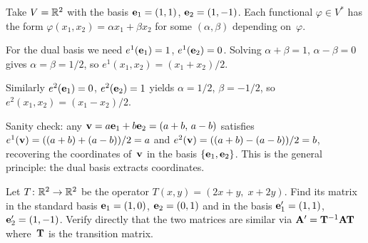 \begin{example}
\label{ex:dual-basis-numeric}
Take $V = \mathbb{R}^2$ with the basis
$\mathbf{e}_1 = (1, 1)$, $\mathbf{e}_2 = (1, -1)$. Each functional
$\varphi \in V^{*}$ has the form $\varphi(x_1, x_2) = \alpha x_1 + \beta x_2$
for some $(\alpha, \beta)$ depending on~$\varphi$.

For the dual basis we need $e^1(\mathbf{e}_1) = 1$, $e^1(\mathbf{e}_2) = 0$.
Solving $\alpha + \beta = 1$, $\alpha - \beta = 0$ gives
$\alpha = \beta = 1/2$, so $e^1(x_1, x_2) = (x_1 + x_2)/2$.

Similarly $e^2(\mathbf{e}_1) = 0$, $e^2(\mathbf{e}_2) = 1$ yields
$\alpha = 1/2$, $\beta = -1/2$, so $e^2(x_1, x_2) = (x_1 - x_2)/2$.

Sanity check: any $\mathbf{v} = a \mathbf{e}_1 + b \mathbf{e}_2 = (a + b,\, a - b)$
satisfies $e^1(\mathbf{v}) = ((a + b) + (a - b))/2 = a$ and
$e^2(\mathbf{v}) = ((a + b) - (a - b))/2 = b$, recovering the
coordinates of~$\mathbf{v}$ in the basis $\{\mathbf{e}_1, \mathbf{e}_2\}$.
This is the general principle: the dual basis extracts coordinates.
\end{example}

\begin{problem}
\label{prob:operator-similarity}
Let $T \colon \mathbb{R}^2 \to \mathbb{R}^2$ be the operator
$T(x, y) = (2x + y,\; x + 2y)$. Find its matrix in the standard basis
$\mathbf{e}_1 = (1, 0)$, $\mathbf{e}_2 = (0, 1)$ and in the basis
$\mathbf{e}'_1 = (1, 1)$, $\mathbf{e}'_2 = (1, -1)$. Verify directly that
the two matrices are similar via $\mathbf{A}' = \mathbf{T}^{-1}\mathbf{A}\mathbf{T}$
where~$\mathbf{T}$ is the transition matrix.
\end{problem}


